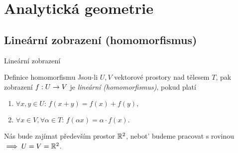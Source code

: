\section{Analytická geometrie}

\subsection{Lineární zobrazení (homomorfismus)}
\begin{frame}[t]{Lineární zobrazení}
    \begin{block}{Definice homomorfismu}
        Jsou-li $U,V$ vektorové prostory nad tělesem $T$, pak zobrazení $f:U \rightarrow V$ je \emph{lineární (homomorfismus)}, pokud platí
        \begin{enumerate}[I]
            \item \(\forall x,y\in U:\,f(x+y)=f(x)+f(y),\)
            \item \(\forall x\in V,\forall \alpha\in T:\,f(\alpha x)=\alpha\cdot f(x).\)
        \end{enumerate}
    \end{block}
    Nás bude zajímat především prostor $\mathbb{R}^2$, nebot' budeme pracovat s rovinou $\implies U=V=\mathbb{R}^2$.
\end{frame}